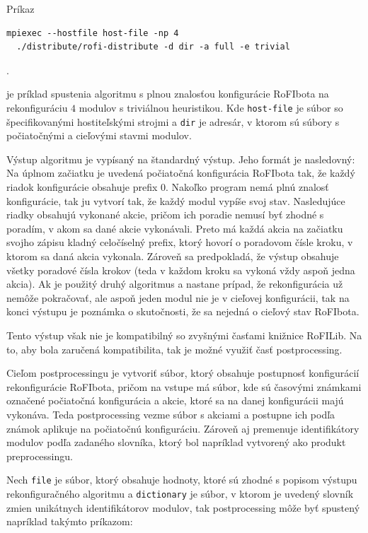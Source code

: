 \documentclass[
  digital, %
  oneside, %
  table,   %
  lof,     %
  nolot,     %
]{fithesis3}
\begin{document}
Príkaz

\begin{verbatim}
mpiexec --hostfile host-file -np 4 
  ./distribute/rofi-distribute -d dir -a full -e trivial
\end{verbatim}.

je príklad spustenia algoritmu s plnou znalosťou konfigurácie RoFIbota na rekonfiguráciu $4$ modulov s triviálnou heuristikou. Kde \texttt{host-file} je súbor so špecifikovanými hostiteľskými strojmi a \texttt{dir} je adresár, v ktorom sú súbory s počiatočnými a cieľovými stavmi modulov. 

Výstup algoritmu je vypísaný na štandardný výstup. Jeho formát je nasledovný: Na úplnom začiatku je uvedená počiatočná konfigurácia RoFIbota tak, že každý riadok konfigurácie obsahuje prefix $0$. Nakoľko program nemá plnú znalosť konfigurácie, tak ju vytvorí tak, že každý modul vypíše svoj stav. Nasledujúce riadky obsahujú vykonané akcie, pričom ich poradie nemusí byť zhodné s poradím, v akom sa dané akcie vykonávali. Preto má každá akcia na začiatku svojho zápisu kladný celočíselný prefix, ktorý hovorí o poradovom čísle kroku, v ktorom sa daná akcia vykonala. Zároveň sa predpokladá, že výstup obsahuje všetky poradové čísla krokov (teda v každom kroku sa vykoná vždy aspoň jedna akcia). Ak je použitý druhý algoritmus a nastane prípad, že rekonfigurácia už nemôže pokračovať, ale aspoň jeden modul nie je v cieľovej konfigurácii, tak na konci výstupu je poznámka o skutočnosti, že sa nejedná o cieľový stav RoFIbota. 

Tento výstup však nie je kompatibilný so zvyšnými časťami knižnice RoFILib. Na to, aby bola zaručená kompatibilita, tak je možné využiť časť postprocessing. 

Cieľom postprocessingu je vytvoriť súbor, ktorý obsahuje postupnosť konfigurácií rekonfigurácie RoFIbota, pričom na vstupe má súbor, kde sú časovými známkami označené počiatočná konfigurácia a akcie, ktoré sa na danej konfigurácii majú vykonáva. Teda postprocessing vezme súbor s akciami a postupne ich podľa známok aplikuje na počiatočnú konfiguráciu. Zároveň aj premenuje identifikátory modulov podľa zadaného slovníka, ktorý bol napríklad vytvorený ako produkt preprocessingu. 

Nech \texttt{file} je súbor, ktorý obsahuje hodnoty, ktoré sú zhodné s popisom výstupu rekonfiguračného algoritmu a \texttt{dictionary} je súbor, v ktorom je uvedený slovník zmien unikátnych identifikátorov modulov, tak postprocessing môže byť spustený napríklad takýmto príkazom: 
\end{document}
